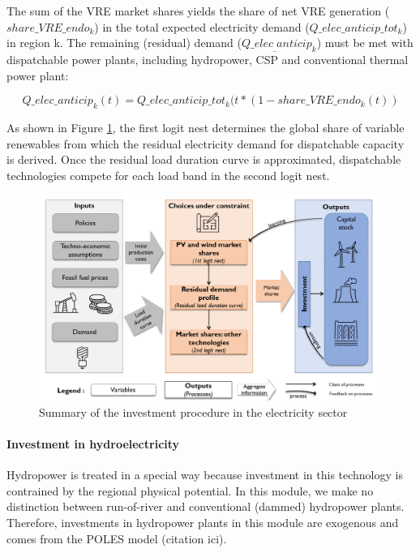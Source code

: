 The sum of the VRE market shares yields the share of net VRE generation ($share\_VRE\_endo_k$) in the total expected electricity demand ($Q\_elec\_anticip\_tot_k$)  in region k. The remaining (residual) demand ($Q\_elec_\_anticip_k$) must be met with dispatchable power plants, including hydropower, CSP and conventional thermal power plant:

\begin{dmath}
    Q\_elec\_anticip_k(t) = Q\_elec\_anticip\_tot_k(t*(1 - share\_VRE\_endo_{k}(t))
    \label{eqn:Q_elec}
\end{dmath}

As shown in Figure \ref{fig:suminv}, the first logit nest determines the global share of variable renewables from which the residual electricity demand for dispatchable capacity is derived. Once the residual load duration curve is approximated, dispatchable technologies compete for each load band in the second logit nest.

\begin{figure}[H]
    \centerline{\includegraphics[scale=0.45]{figures&tables/Summary_nexus.png}} %
    \caption{Summary of the investment procedure in the electricity sector}
    \label{fig:suminv}
\end{figure}


\paragraph{Investment in hydroelectricity}

Hydropower is treated in a special way because investment in this technology is contrained by the regional physical potential.
In this module, we make no distinction between run-of-river and conventional (dammed) hydropower plants. Therefore, investments in hydropower plants in this module are exogenous and comes from the POLES model (citation ici).


